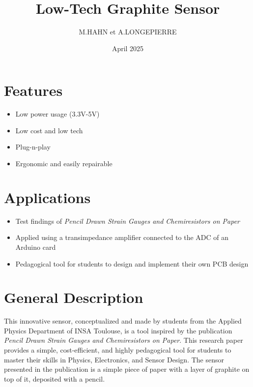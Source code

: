 \documentclass[10pt]{datasheet}
\title{Low-Tech Graphite Sensor}
\author{M.HAHN et A.LONGEPIERRE}
\date{April 2025}
\begin{document}
\maketitle


\section{Features}

\begin{itemize}
\item{Low power usage (3.3V-5V)}
\item{Low cost and low tech}
\item{Plug-n-play}
\item{Ergonomic and easily repairable}
\end{itemize}

\section{Applications}

\begin{itemize}
\item{Test findings of \it{Pencil Drawn Strain Gauges and Chemiresistors on Paper}\footnotemark{}}
\item{Applied using a transimpedance amplifier connected to the ADC of an Arduino card}
\item{Pedagogical tool for students to design and implement their own PCB design}
\end{itemize}

\section{General Description}
This innovative sensor, conceptualized and made by students from the Applied Physics Department of INSA Toulouse, is a tool inspired by the publication 
\textit{Pencil Drawn Strain Gauges and Chemiresistors on Paper}\footnotemark[\value{footnote}]. This research paper provides a simple, cost-efficient, and highly pedagogical tool for students 
to master their skills in Physics, Electronics, and Sensor Design. The sensor presented in the publication is a simple piece of paper with a layer of graphite 
on top of it, deposited with a pencil. 
\end{document}
